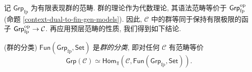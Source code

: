 

记 $\mathsf {Grp}_{\text{fp}}$ 为有限表现群的范畴.
群的理论作为代数理论, 其语法范畴等价于 $\mathsf {Grp}_{\text{fp}}^{\text{op}}$ (命题 \ref{context-dual-to-fin-gen-models}). 因此, \topos{} $\mathcal C$ 中的群等同于保持有限极限的函子 $\mathsf {Grp}_{\text{fp}}^{\text{op}} \to \mathcal C$. 再应用预层范畴的性质, 我们得到如下结论.

\begin{prop}
	{(群的分类\topos{})}
	\topos{} $\mathsf {Fun}(\mathsf {Grp}_{\text{fp}},\mathsf {Set})$ 是\emph{群的分类\topos{}}, 即对任何\topos{} $\mathcal C$ 有范畴等价
	$$
	\mathsf {Grp}(\mathcal C) \simeq \mathsf{Hom}_{\Top}(\mathcal C,\mathsf {Fun}(\mathsf {Grp}_{\text{fp}},\mathsf {Set})).
	$$
\end{prop}
%	

